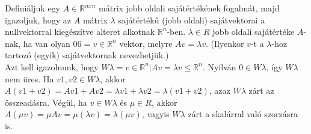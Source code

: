 \begin{frame}
  \begin{tcolorbox}[title={15. (4p)}]
       Definiáljuk egy $A \in \mathbb{R}^{n x n}$ mátrix jobb oldali sajátértékének fogalmát, majd igazoljuk, hogy az $A$ mátrix ${\lambda}$ sajátértékű (jobb oldali) sajátvektorai a nullvektorral kiegészítve alteret alkotnak $\mathbb{R}^n$-ben.
  \tcblower
    ${\lambda} \in R$ jobb oldali sajátértéke $A$-nak, ha van olyan $0 6= v \in \mathbb{R}^n$ vektor, melyre $Av = {\lambda}v$. (Ilyenkor $v$-t a ${\lambda}$-hoz tartozó (egyik) sajátvektornak nevezhetjük.)\\
    
    Azt kell igazolnunk, hogy $W{\lambda} = {v \in \mathbb{R}^n |Av = {\lambda}v} \leq \mathbb{R}^n$. Nyilván $0 \in W{\lambda}$, így $W{\lambda}$ nem üres. Ha $v1,v2 \in W{\lambda}$, akkor $A(v1 +v2) = Av1 +Av2 = {\lambda}v1 +{\lambda}v2 = {\lambda}(v1 +v2)$, azaz $W{\lambda}$ zárt az összeadásra. Végül, ha $v \in W{\lambda}$ és ${\mu} \in R$, akkor $A({\mu}v) = {\mu}Av = {\mu}({\lambda}v) = {\lambda}({\mu}v)$, vagyis $W{\lambda}$ zárt a skalárral való szorzásra is.
  \end{tcolorbox}
\end{frame}



